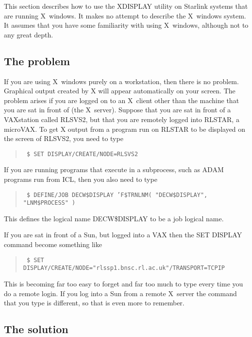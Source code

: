 This section describes how to use the XDISPLAY utility on Starlink systems that
are running X~windows. It makes no attempt to describe the X~windows system. It
assumes that you have some familiarity with using X~windows, although not to
any great depth.

\subsection{The problem}

If you are using X~windows purely on a workstation, then there is no problem.
Graphical output created by X will appear automatically on your
screen. The problem arises if you are logged on to an X~client other than
the machine that you are sat in front of (the X~server). Suppose
that you are sat in front of a VAXstation called RLSVS2, but that you are
remotely logged into RLSTAR, a microVAX. To get X output from a program run
on RLSTAR to be displayed on the screen of RLSVS2, you need to type

\begin{quote}{\tt
\$ SET DISPLAY/CREATE/NODE=RLSVS2
}
\end{quote}

If you are running programs that execute in a subprocess, such as ADAM programs
run from ICL, then you also need to type

\begin{quote}{\tt
\$ DEFINE/JOB DECW\$DISPLAY 'F\$TRNLNM( "DECW\$DISPLAY", "LNM\$PROCESS" )
}
\end{quote}

This defines the logical name DECW\$DISPLAY to be a job logical name.

If you are sat in front of a Sun, but logged into a VAX then the SET DISPLAY
command become something like

\begin{quote}{\tt
\$ SET DISPLAY/CREATE/NODE="rlssp1.bnsc.rl.ac.uk"/TRANSPORT=TCPIP
}
\end{quote}

This is becoming far too easy to forget and far too much to type every time you
do a remote login. If you log into a Sun from a remote X~server the command
that you type is different, so that is even more to remember.

\subsection{The solution}

